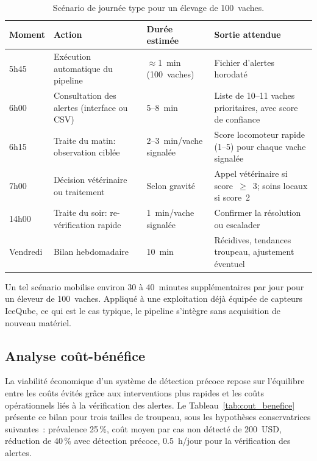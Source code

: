 \begin{table}[H]
    \centering
    \small
    \caption{Scénario de journée type pour un élevage de 100~vaches.}
    \label{tab:routine_eleveur}
    \begin{tabular}{lp{3.4cm}p{3.0cm}p{4.0cm}}
        \toprule
        \textbf{Moment} & \textbf{Action} & \textbf{Durée estimée}
            & \textbf{Sortie attendue} \\
        \midrule
        5h45 & Exécution automatique du pipeline & $\approx$1~min (100~vaches)
            & Fichier d'alertes horodaté \\
        \addlinespace
        6h00 & Consultation des alertes (interface ou CSV) & 5--8~min
            & Liste de 10--11 vaches prioritaires, avec score de confiance \\
        \addlinespace
        6h15 & Traite du matin: observation ciblée & 2--3~min/vache signalée
            & Score locomoteur rapide (1--5) pour chaque vache signalée \\
        \addlinespace
        7h00 & Décision vétérinaire ou traitement & Selon gravité
            & Appel vétérinaire si score~$\geq$~3; soins locaux si score~2 \\
        \addlinespace
        14h00 & Traite du soir: re-vérification rapide & 1~min/vache signalée
            & Confirmer la résolution ou escalader \\
        \addlinespace
        Vendredi & Bilan hebdomadaire & 10~min
            & Récidives, tendances troupeau, ajustement éventuel \\
        \bottomrule
    \end{tabular}
\end{table}

Un tel scénario mobilise environ 30 à 40~minutes supplémentaires par jour pour un éleveur
de 100~vaches. Appliqué à une exploitation déjà équipée de capteurs IceQube, ce qui
est le cas typique, le pipeline s'intègre sans acquisition de nouveau matériel.

\subsection{Analyse coût-bénéfice}

La viabilité économique d'un système de détection précoce repose sur l'équilibre entre
les coûts évités grâce aux interventions plus rapides et les coûts opérationnels liés à
la vérification des alertes. Le Tableau~\ref{tab:cout_benefice} présente ce bilan pour
trois tailles de troupeau, sous les hypothèses conservatrices suivantes~: prévalence
25\,\%, coût moyen par cas non détecté de 200~USD, réduction de 40\,\% avec détection
précoce, 0.5~h/jour pour la vérification des alertes.

